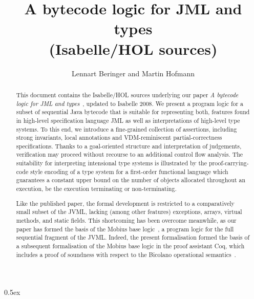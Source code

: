 \documentclass[11pt,a4paper]{article}
\begin{document}
\title{A bytecode logic for JML and types\\ (Isabelle/HOL sources)}
\author{Lennart Beringer and Martin Hofmann}

\maketitle

\begin{abstract}
  This document contains the Isabelle/HOL sources underlying our paper
  \emph{A bytecode logic for JML and
    types}~\cite{DBLP:conf/aplas/BeringerH06}, updated to Isabelle
  2008. We present a program logic for a subset of sequential Java
  bytecode that is suitable for representing both, features found in
  high-level specification language JML as well as interpretations of
  high-level type systems. To this end, we introduce a fine-grained
  collection of assertions, including strong invariants, local
  annotations and VDM-reminiscent partial-correctness specifications.
  Thanks to a goal-oriented structure and interpretation of
  judgements, verification may proceed without recourse to an
  additional control flow analysis. The suitability for interpreting
  intensional type systems is illustrated by the proof-carrying-code
  style encoding of a type system for a first-order functional
  language which guarantees a constant upper bound on the number of
  objects allocated throughout an execution, be the execution
  terminating or non-terminating.

  Like the published paper, the formal development is restricted to a
  comparatively small subset of the JVML, lacking (among other
  features) exceptions, arrays, virtual methods, and static fields.
  This shortcoming has been overcome meanwhile, as our paper has
  formed the basis of the {\sc Mobius} base
  logic~\cite{MobiusDeliverable3.1}, a program logic for the full
  sequential fragment of the JVML. Indeed, the present formalisation
  formed the basis of a subsequent formalisation of the {\sc Mobius}
  base logic in the proof assistant Coq, which includes a proof of
  soundness with respect to the Bicolano operational
  semantics~\cite{Pichardie06}.
\end{abstract}

\tableofcontents

\parindent 0pt\parskip 0.5ex





\end{document}
